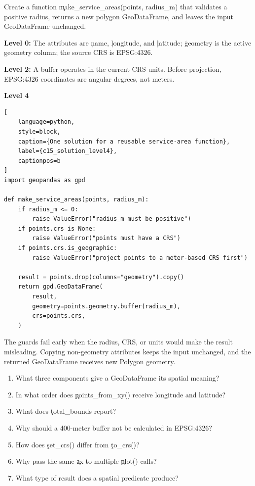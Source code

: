 
Create a function \c{make_service_areas(points, radius_m)} that validates a
positive radius, returns a new polygon GeoDataFrame, and leaves the input
GeoDataFrame unchanged.


\textbf{Level 0:} The attributes are \c{name}, \c{longitude}, and \c{latitude};
\c{geometry} is the active geometry column; the source CRS is EPSG:4326.

\textbf{Level 2:} A buffer operates in the current CRS units. Before projection,
EPSG:4326 coordinates are angular degrees, not meters.

\textbf{Level 4}

\begin{lstlisting}[
    language=python,
    style=block,
    caption={One solution for a reusable service-area function},
    label={c15_solution_level4},
    captionpos=b
]
import geopandas as gpd

def make_service_areas(points, radius_m):
    if radius_m <= 0:
        raise ValueError("radius_m must be positive")
    if points.crs is None:
        raise ValueError("points must have a CRS")
    if points.crs.is_geographic:
        raise ValueError("project points to a meter-based CRS first")

    result = points.drop(columns="geometry").copy()
    return gpd.GeoDataFrame(
        result,
        geometry=points.geometry.buffer(radius_m),
        crs=points.crs,
    )
\end{lstlisting}

The guards fail early when the radius, CRS, or units would make the result
misleading. Copying non-geometry attributes keeps the input unchanged, and the
returned GeoDataFrame receives new Polygon geometry.


\begin{enumerate}
    \item What three components give a GeoDataFrame its spatial meaning?
    \item In what order does \c{points_from_xy()} receive longitude and latitude?
    \item What does \c{total_bounds} report?
    \item Why should a 400-meter buffer not be calculated in EPSG:4326?
    \item How does \c{set_crs()} differ from \c{to_crs()}?
    \item Why pass the same \c{ax} to multiple \c{plot()} calls?
    \item What type of result does a spatial predicate produce?
\end{enumerate}

